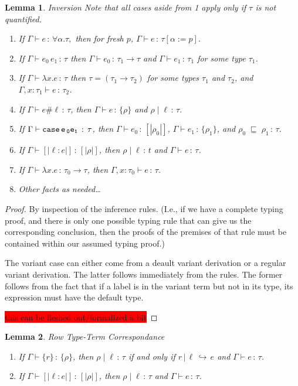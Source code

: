\documentclass{article}
\newcommand{\todo}[1]{\colorbox{red}{#1}}
\newtheorem{lemma}{Lemma}
\newcommand{\variant}[1]{[\!|#1|\!]}
\newcommand{\case}[2]{\tt{case}\,#1\,#2}
\newcommand{\app}[2]{#1\,#2}
\newcommand{\lam}[2]{\lambda #1 . #2}
\newcommand{\hastp}[3]{#1 \vdash #2 \,:\, #3}
\newcommand{\haslbl}[3]{#1\;|\;#2\,:\, #3}
\newcommand{\caseVarRcd}[3]{#1 \;\sqsubseteq\; #2 \,:\, #3}
\newcommand{\haslbltm}[3]{#1\,|\,#2\,\hookrightarrow\, #3}
\begin{document}
\begin{lemma}{Inversion} \label{lem:inversion}
Note that all cases aside from 1 apply only if \(\tau\) is not quantified.
\mbox{}
\begin{enumerate}
\item If \(\hastp \Gamma e {\forall \alpha. \tau},\) then for fresh \(p\), \(\hastp \Gamma e
  {\tau[\alpha := p]}\).
\item If $\hastp{\Gamma}{\app{e_0}{e_1}}{\tau}$ then
  $\hastp{\Gamma}{e_0}{\tau_1\to\tau}$ and $\hastp{\Gamma}{e_1}{\tau_1}$ for some type $\tau_1$.
\item If $\hastp{\Gamma}{\lam{x}{e}}{\tau}$ then $\tau = (\tau_1\to\tau_2)$ for
some types $\tau_1$ and $\tau_2$, and
  $\hastp{\Gamma,x:\tau_1}{e}{\tau_2}$.
\item If \(\hastp \Gamma {e \# \ell} \tau\), then \(\hastp \Gamma e {\{\rho\}}\)
  and \(\haslbl \rho \ell \tau\).
\item If \(\hastp \Gamma {\case e_0 e_1} \tau\), then \(\hastp \Gamma {e_0}
  {\variant {\rho_0}}\), \(\hastp \Gamma {e_1} {\{\rho_1\}}\), and \(\caseVarRcd
  {\rho_0} {\rho_1} \tau\).
\item If \(\hastp \Gamma {\variant {\ell : e}} {\variant \rho}\), then \(\haslbl
  \rho \ell t\) and \(\hastp \Gamma e \tau\).
\item If \(\hastp \Gamma {\lambda x. e} {\tau_0 \to \tau}\), then \(\hastp
  {\Gamma, x : \tau_0} e \tau\).
\item Other facts as needed\ldots
\end{enumerate}
\end{lemma}

\begin{proof}
By inspection of the inference rules. (I.e., if we have a complete typing proof,
and there is only one possible typing rule that can give us the corresponding conclusion,
then the proofs of the premises of that rule must be contained within our assumed typing proof.)

The variant case can either come from a deault variant derivation or a regular
variant derivation. The latter follows immediately from the rules. The former
follows from the fact that if a label is in the variant term but not in its
type, its expression must have the default type.

\todo{this can be fleshed out/formalized a bit}

\end{proof}

\begin{lemma}{Row Type-Term Correspondance} \label{lem:row-type-term}
  \mbox{}
  \begin{enumerate}
  \item If \(\hastp \Gamma {\{r\}} {\{\rho\}}\), then \(\haslbl \rho \ell \tau\)
    if and only if \(\haslbltm r \ell e\) and \(\hastp \Gamma e \tau\).
  \item If \(\hastp \Gamma {\variant {\ell : e}} {\variant \rho}\), then
    \(\haslbl \rho \ell \tau\) and \(\hastp \Gamma e \tau\).
  \end{enumerate}
\end{lemma}
\end{document}
